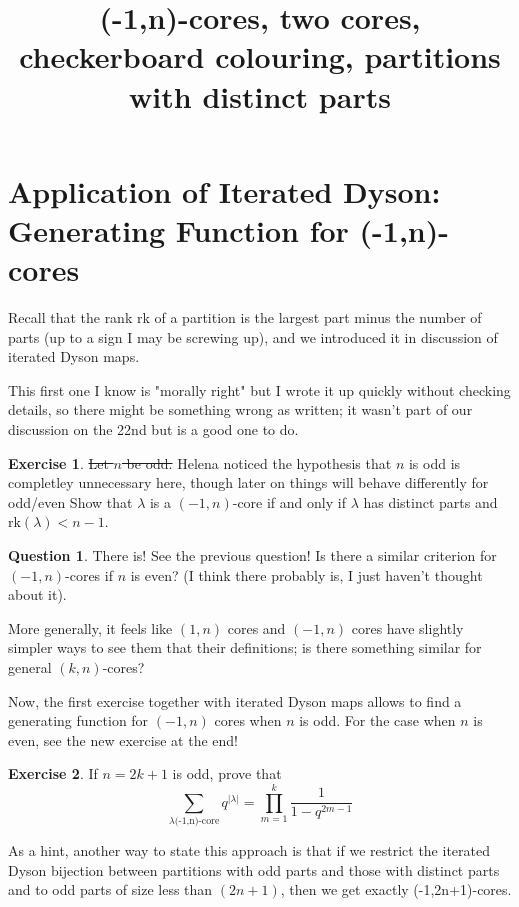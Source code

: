 \documentclass{article}
\title{(-1,n)-cores, two cores, checkerboard colouring, partitions with distinct parts}
\theoremstyle{definition}
\newtheorem{question}{Question}
\newtheorem{exercise}{Exercise}
\begin{document}
\maketitle


\section{Application of Iterated Dyson: Generating Function for (-1,n)-cores}

Recall that the rank rk of a partition is the largest part minus the number of parts (up to a sign I may be screwing up), and we introduced it in discussion of iterated Dyson maps.

This first one I know is "morally right" but I wrote it up quickly without checking details, so there might be something wrong as written; it wasn't part of our discussion on the 22nd but is a good one to do.

\begin{exercise}
\sout{Let $n$ be odd.} {\color{red} Helena noticed the hypothesis that $n$ is odd is completley unnecessary here, though later on things will behave differently for odd/even}  Show that $\lambda$ is a $(-1,n)$-core if and only if $\lambda$ has distinct parts and $\textrm{rk}(\lambda)<n-1$.  
\end{exercise}


\begin{question} {\color{red} There is!  See the previous question!}
Is there a similar criterion for $(-1,n)$-cores if $n$ is even?  (I think there probably is, I just haven't thought about it). \textbf{}
\end{question}

More generally, it feels like $(1,n)$ cores and $(-1,n)$ cores have slightly simpler ways to see them that their definitions; is there something similar for general $(k,n)$-cores?


Now, the first exercise together with iterated Dyson maps allows to find a generating function for $(-1,n)$ cores when $n$ is odd.  {\color{red} For the case when $n$ is even, see the new exercise at the end!}

\begin{exercise}
If $n=2k+1$ is odd, prove that
$$\sum_{\lambda \textrm{(-1,n)-core}} q^{|\lambda|}=\prod_{m=1}^k \frac{1}{1-q^{2m-1}}$$
\end{exercise}

As a hint, another way to state this approach is that if we restrict the iterated Dyson bijection between partitions with odd parts and those with distinct parts and to odd parts of size less than $(2n+1)$, then we get exactly (-1,2n+1)-cores.
\end{document}
